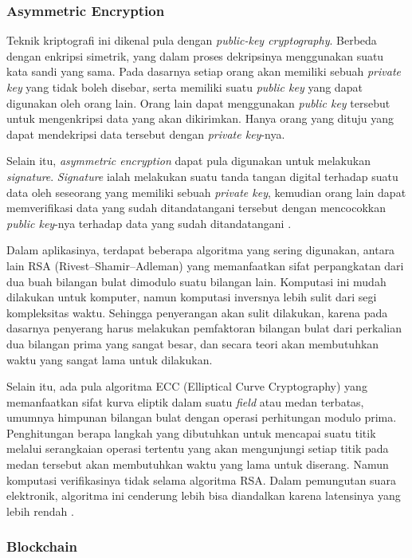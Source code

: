 \documentclass[12pt, a4paper, final]{article}
\begin{document}
\subsubsection{Asymmetric Encryption}

Teknik kriptografi ini dikenal pula dengan \textit{public-key cryptography}. Berbeda dengan enkripsi simetrik, yang dalam proses dekripsinya menggunakan suatu kata sandi yang sama. Pada dasarnya setiap orang akan memiliki sebuah \textit{private key} yang tidak boleh disebar, serta memiliki suatu \textit{public key} yang dapat digunakan oleh orang lain. Orang lain dapat menggunakan \textit{public key} tersebut untuk mengenkripsi data yang akan dikirimkan. Hanya orang yang dituju yang dapat mendekripsi data tersebut dengan \textit{private key}-nya.

Selain itu, \textit{asymmetric encryption} dapat pula digunakan untuk melakukan \textit{signature}. \textit{Signature} ialah melakukan suatu tanda tangan digital terhadap suatu data oleh seseorang yang memiliki sebuah \textit{private key}, kemudian orang lain dapat memverifikasi data yang sudah ditandatangani tersebut dengan mencocokkan \textit{public key}-nya terhadap data yang sudah ditandatangani \citep{pubkey}.

Dalam aplikasinya, terdapat beberapa algoritma yang sering digunakan, antara lain RSA (Rivest–Shamir–Adleman) yang memanfaatkan sifat perpangkatan dari dua buah bilangan bulat dimodulo suatu bilangan lain. Komputasi ini mudah dilakukan untuk komputer, namun komputasi inversnya lebih sulit dari segi kompleksitas waktu. Sehingga penyerangan akan sulit dilakukan, karena pada dasarnya penyerang harus melakukan pemfaktoran bilangan bulat dari perkalian dua bilangan prima yang sangat besar, dan secara teori akan membutuhkan waktu yang sangat lama untuk dilakukan.

Selain itu, ada pula algoritma ECC (Elliptical Curve Cryptography) yang memanfaatkan sifat kurva eliptik dalam suatu \textit{field} atau medan terbatas, umumnya himpunan bilangan bulat dengan operasi perhitungan modulo prima. Penghitungan berapa langkah yang dibutuhkan untuk mencapai suatu titik melalui serangkaian operasi tertentu yang akan mengunjungi setiap titik pada medan tersebut akan membutuhkan waktu yang lama untuk diserang. Namun komputasi verifikasinya tidak selama algoritma RSA. Dalam pemungutan suara elektronik, algoritma ini cenderung lebih bisa diandalkan karena latensinya yang lebih rendah \citep{mahto2017rsa}.

\subsubsection{Blockchain}
\end{document}

